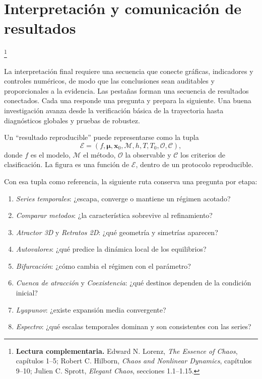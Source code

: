 \documentclass[11pt,a4paper]{article}
\newcommand{\gui}[1]{\textsf{\emph{#1}}}
\newcommand{\lecturaseccion}[1]{%
  \par\noindent{\sffamily\scriptsize\color{Teal}Lectura complementaria}\footnote{%
  \textbf{Lectura complementaria.} #1}\par}
\begin{document}




\section[\texorpdfstring{\hspace{0.45em}}{}Interpretación y comunicación de resultados]{Interpretación y comunicación de resultados}
\lecturaseccion{Edward N. Lorenz, \emph{The Essence of Chaos}, capítulos 1--5; Robert C. Hilborn, \emph{Chaos and Nonlinear Dynamics}, capítulos 9--10; Julien C. Sprott, \emph{Elegant Chaos}, secciones 1.1--1.15.}

La interpretación final requiere una secuencia que conecte gráficas, indicadores y
controles numéricos, de modo que las conclusiones sean auditables y proporcionales a la
evidencia. Las pestañas forman una secuencia de resultados conectados. Cada una responde una
pregunta y prepara la siguiente. Una buena investigación avanza desde la verificación
básica de la trayectoria hasta diagnósticos globales y pruebas de robustez.

Un ``resultado reproducible'' puede representarse como la tupla
\[
 \mathcal E=(f,\boldsymbol\mu,\mathbf{x}_0,\mathcal M,h,T,T_0,
 \mathcal O,\mathcal C),
\]
donde $f$ es el modelo, $\mathcal M$ el método, $\mathcal O$ la observable y
$\mathcal C$ los criterios de clasificación. La figura es una función de
$\mathcal E$, dentro de un protocolo reproducible.

Con esa tupla como referencia, la siguiente ruta conserva una pregunta por etapa:
\begin{enumerate}
  \item \gui{Series temporales}: ¿escapa, converge o mantiene un régimen acotado?
  \item \gui{Comparar metodos}: ¿la característica sobrevive al refinamiento?
  \item \gui{Atractor 3D} y \gui{Retratos 2D}: ¿qué geometría y simetrías aparecen?
  \item \gui{Autovalores}: ¿qué predice la dinámica local de los equilibrios?
  \item \gui{Bifurcación}: ¿cómo cambia el régimen con el parámetro?
  \item \gui{Cuenca de atracción} y \gui{Coexistencia}: ¿qué destinos dependen de la condición inicial?
  \item \gui{Lyapunov}: ¿existe expansión media convergente?
  \item \gui{Espectro}: ¿qué escalas temporales dominan y son consistentes con las series?
\end{enumerate}
\end{document}
